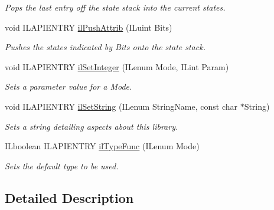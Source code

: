 \begin{DoxyCompactItemize}
\begin{DoxyCompactList}\small\item\em Pops the last entry off the state stack into the current states. \end{DoxyCompactList}\item 
void I\-L\-A\-P\-I\-E\-N\-T\-R\-Y \hyperlink{group__state_ga72e0879c71f59f06c35d2e2a10191fa8}{il\-Push\-Attrib} (I\-Luint Bits)
\begin{DoxyCompactList}\small\item\em Pushes the states indicated by Bits onto the state stack. \end{DoxyCompactList}\item 
void I\-L\-A\-P\-I\-E\-N\-T\-R\-Y \hyperlink{group__state_ga74a39ec8faa5aa005e918a7049985ef6}{il\-Set\-Integer} (I\-Lenum Mode, I\-Lint Param)
\begin{DoxyCompactList}\small\item\em Sets a parameter value for a {\itshape Mode}. \end{DoxyCompactList}\item 
void I\-L\-A\-P\-I\-E\-N\-T\-R\-Y \hyperlink{group__state_ga9a4eb898282d4a5cdecc6303bca20814}{il\-Set\-String} (I\-Lenum String\-Name, const char $\ast$String)
\begin{DoxyCompactList}\small\item\em Sets a string detailing aspects about this library. \end{DoxyCompactList}\item 
\hypertarget{group__state_ga7ab67de503e1fad00d984167aee02fa9}{I\-Lboolean I\-L\-A\-P\-I\-E\-N\-T\-R\-Y \hyperlink{group__state_ga7ab67de503e1fad00d984167aee02fa9}{il\-Type\-Func} (I\-Lenum Mode)}\label{group__state_ga7ab67de503e1fad00d984167aee02fa9}

\begin{DoxyCompactList}\small\item\em Sets the default type to be used. \end{DoxyCompactList}\end{DoxyCompactItemize}


\subsection{Detailed Description}


